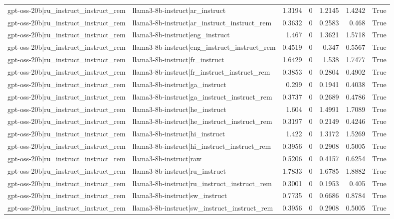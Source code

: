 \begin{table}
\begin{tabular}{l l r r r r l}
gpt-oss-20b|ru_instruct_instruct_rem & llama3-8b-instruct|ar_instruct & 1.3194 & 0 & 1.2145 & 1.4242 & True \\
gpt-oss-20b|ru_instruct_instruct_rem & llama3-8b-instruct|ar_instruct_instruct_rem & 0.3632 & 0 & 0.2583 & 0.468 & True \\
gpt-oss-20b|ru_instruct_instruct_rem & llama3-8b-instruct|eng_instruct & 1.467 & 0 & 1.3621 & 1.5718 & True \\
gpt-oss-20b|ru_instruct_instruct_rem & llama3-8b-instruct|eng_instruct_instruct_rem & 0.4519 & 0 & 0.347 & 0.5567 & True \\
gpt-oss-20b|ru_instruct_instruct_rem & llama3-8b-instruct|fr_instruct & 1.6429 & 0 & 1.538 & 1.7477 & True \\
gpt-oss-20b|ru_instruct_instruct_rem & llama3-8b-instruct|fr_instruct_instruct_rem & 0.3853 & 0 & 0.2804 & 0.4902 & True \\
gpt-oss-20b|ru_instruct_instruct_rem & llama3-8b-instruct|ga_instruct & 0.299 & 0 & 0.1941 & 0.4038 & True \\
gpt-oss-20b|ru_instruct_instruct_rem & llama3-8b-instruct|ga_instruct_instruct_rem & 0.3737 & 0 & 0.2689 & 0.4786 & True \\
gpt-oss-20b|ru_instruct_instruct_rem & llama3-8b-instruct|he_instruct & 1.604 & 0 & 1.4991 & 1.7089 & True \\
gpt-oss-20b|ru_instruct_instruct_rem & llama3-8b-instruct|he_instruct_instruct_rem & 0.3197 & 0 & 0.2149 & 0.4246 & True \\
gpt-oss-20b|ru_instruct_instruct_rem & llama3-8b-instruct|hi_instruct & 1.422 & 0 & 1.3172 & 1.5269 & True \\
gpt-oss-20b|ru_instruct_instruct_rem & llama3-8b-instruct|hi_instruct_instruct_rem & 0.3956 & 0 & 0.2908 & 0.5005 & True \\
gpt-oss-20b|ru_instruct_instruct_rem & llama3-8b-instruct|raw & 0.5206 & 0 & 0.4157 & 0.6254 & True \\
gpt-oss-20b|ru_instruct_instruct_rem & llama3-8b-instruct|ru_instruct & 1.7833 & 0 & 1.6785 & 1.8882 & True \\
gpt-oss-20b|ru_instruct_instruct_rem & llama3-8b-instruct|ru_instruct_instruct_rem & 0.3001 & 0 & 0.1953 & 0.405 & True \\
gpt-oss-20b|ru_instruct_instruct_rem & llama3-8b-instruct|sw_instruct & 0.7735 & 0 & 0.6686 & 0.8784 & True \\
gpt-oss-20b|ru_instruct_instruct_rem & llama3-8b-instruct|sw_instruct_instruct_rem & 0.3956 & 0 & 0.2908 & 0.5005 & True \\

\end{tabular}
\end{table}
